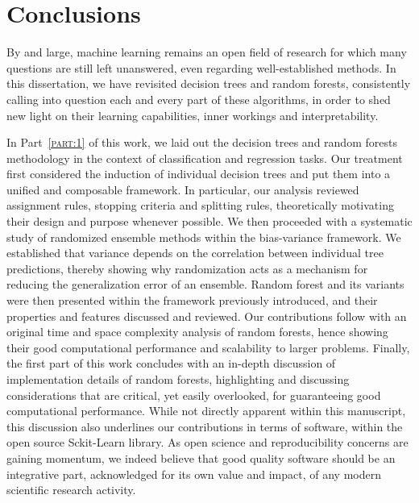 \chapter{Conclusions}\label{ch:conclusions}

By and large, machine learning remains an open field of research for which many
questions are still left unanswered, even regarding well-established methods.
In this dissertation, we have revisited decision trees and random forests,
consistently calling into question each and every part of these algorithms, in
order to shed new light on their learning capabilities, inner workings and
interpretability.

In Part~\textsc{\ref{part:1}} of this work, we laid out the decision trees and
random forests methodology in the context of classification and regression
tasks. Our treatment first considered the induction of individual decision
trees and put them into a unified and composable framework. In particular, our
analysis reviewed assignment rules, stopping criteria and splitting rules,
theoretically motivating their design and purpose whenever possible. We then
proceeded with a systematic study of randomized ensemble methods within the
bias-variance framework. We established that variance depends on the
correlation between individual tree predictions, thereby showing why
randomization acts as a mechanism for reducing the generalization error of an
ensemble.  Random forest and its variants were then presented within the
framework previously introduced, and their properties and features discussed
and reviewed. Our contributions follow with an original time and space
complexity analysis of random forests, hence showing their good computational
performance and scalability to larger problems. Finally, the first part of this
work concludes with an in-depth discussion of implementation details of random
forests, highlighting and discussing considerations that are critical, yet
easily overlooked, for guaranteeing good computational performance. While not
directly apparent within this manuscript, this discussion also underlines our
contributions in terms of software, within the open source Sckit-Learn library.
As open science and reproducibility concerns are gaining momentum, we indeed
believe that good quality software should be an integrative part, acknowledged
for its own value and impact, of any modern scientific research activity.

